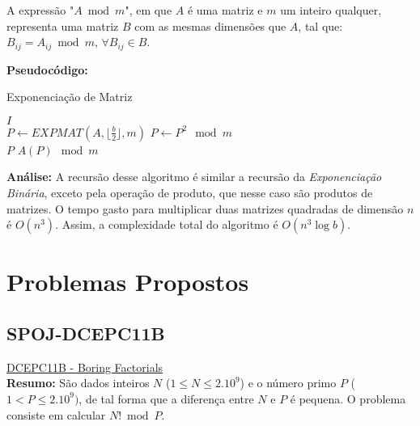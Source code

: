\begin{definition}
A expressão "$A \bmod m$", em que $A$ é uma matriz e $m$ um inteiro qualquer, representa uma matriz $B$ com as mesmas dimensões que $A$, tal que: $B_{ij} = A_{ij} \bmod m$, $\forall B_{ij} \in B$.
\end{definition}

\textbf{Pseudocódigo:}
\begin{algorithm}
\caption{Exponenciação de Matriz}\label{exponenciacao_matrix}
\begin{algorithmic}[1]
\State \Return $I$ 
\EndIf 
\\
\State $P \gets EXPMAT(A, \lfloor \frac{b}{2} \rfloor, m)$
\State $P \gets P^2 \mod m$
\\
\State \Return $P$
\Else
\State \Return $A(P) \mod m$
\EndIf

\EndProcedure
\end{algorithmic}
\end{algorithm}


\textbf{Análise:}
A recursão desse algoritmo é similar a recursão da \textit{Exponenciação Binária}, exceto pela operação de produto, que nesse caso são produtos de matrizes. O tempo gasto para multiplicar duas matrizes quadradas de dimensão $n$ é $O(n^3)$. Assim, a complexidade total 
do algoritmo é $O(n^3 \log b)$.





\section{Problemas Propostos}



\subsection{SPOJ-DCEPC11B}
\href{http://www.spoj.com/problems/DCEPC11B/}{DCEPC11B - Boring Factorials}\\

\textbf{Resumo:}
São dados inteiros $N$ ($1\leq N \leq 2.10^9$) e o número primo $P$ ($1 < P \leq 2.10^9)$, de tal forma que a diferença entre $N$ e $P$ é pequena.
O problema consiste em calcular $N! \bmod P$.
\\

